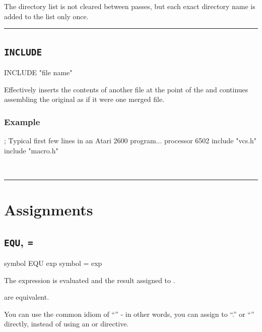 The directory list is not cleared between passes, but each exact directory name is added to the list only once.
\\
\hrule
\subsection{\texttt{INCLUDE}}
\label{pseudoop:include}


\begin{usage}
  INCLUDE "file name"
\end{usage}

Effectively inserts the contents of another file at the point of the  and continues assembling the original as if it were one merged file.

\subsubsection{Example}

\begin{code}[caption=Declaring the Platform]
; Typical first few lines in an Atari 2600 program...
   processor 6502
   include "vcs.h"
   include "macro.h"
\end{code}\\

\hrule

\section{Assignments}

\subsection{\texttt{EQU}, \texttt{=}}
\label{pseudoop:equ}
\label{pseudoop:=}


\begin{usage}
symbol EQU exp
symbol = exp
\end{usage}

The expression is evaluated and the result assigned to
.

 are equivalent.

You can use the common idiom of ``'' - in other words, you can assign to ``.'' or ``\text{*}'' directly, instead of using an  or  directive.

